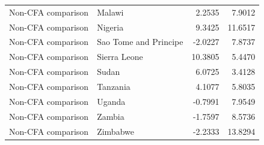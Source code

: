 \begin{table}
\begin{tabular}[t]{llrr}
Non-CFA comparison & Malawi & 2.2535 & 7.9012\\
Non-CFA comparison & Nigeria & 9.3425 & 11.6517\\
Non-CFA comparison & Sao Tome and Principe & -2.0227 & 7.8737\\
Non-CFA comparison & Sierra Leone & 10.3805 & 5.4470\\
\addlinespace
Non-CFA comparison & Sudan & 6.0725 & 3.4128\\
Non-CFA comparison & Tanzania & 4.1077 & 5.8035\\
Non-CFA comparison & Uganda & -0.7991 & 7.9549\\
Non-CFA comparison & Zambia & -1.7597 & 8.5736\\
Non-CFA comparison & Zimbabwe & -2.2333 & 13.8294\\
\bottomrule
\end{tabular}
\end{table}